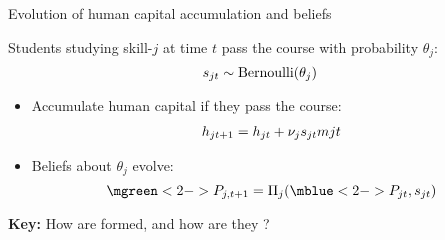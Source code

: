 \begin{frame}{Evolution of human capital accumulation and beliefs}


Students studying skill-$j$ at time $t$ pass the course with probability $\theta_j$:
\begin{equation*}
    s_{jt} \sim \text{Bernoulli} (\theta_j)
\end{equation*}
\vspace{-2.5ex}
\begin{itemize}
  \item 
  Accumulate human capital if they pass the course:
  \begin{align*}
    h_{jt+1} = h_{jt} + \nu_{j} s_{jt} m{jt}
  \end{align*}
  \item 
  Beliefs about $\theta_j$ evolve:
  \begin{equation*}
      \mgreen<2->{P_{j,t+1}} = \Pi_j (\mblue<2->{P_{jt}}, \pass_{jt})
  \end{equation*}
\end{itemize}

\pause
\vspace{5ex}
\textbf{Key:} How are   formed, and how are they ? 


\end{frame}

